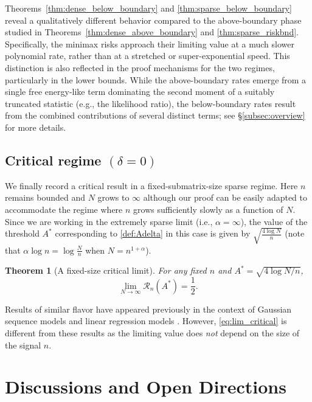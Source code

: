 \documentclass[11pt,reqno,letterpaper]{amsart}
\numberwithin{equation}{section}
\theoremstyle{plain}
\newtheorem{theorem}{Theorem}[section]
\begin{document}
Theorems~\ref{thm:dense_below_boundary} and \ref{thm:sparse_below_boundary} reveal a qualitatively different behavior compared to the above-boundary phase studied in 
Theorems~\ref{thm:dense_above_boundary} and \ref{thm:sparse_riskbnd}. Specifically, the minimax risks approach their limiting value at a much slower polynomial rate, rather than at a stretched or super-exponential speed. This distinction is also reflected in the proof mechanisms for the two regimes, particularly in the lower bounds. While the above-boundary rates emerge from a single free energy-like term dominating the second moment of a suitably truncated statistic (e.g., the likelihood ratio), the below-boundary rates result from the combined contributions of several distinct terms; see \S\ref{subsec:overview} for more details. 


\subsection{Critical regime $(\delta=0)$}\label{subsec:main_on_bnd}
We finally record a critical result in a fixed-submatrix-size sparse regime. Here 
$n$ remains bounded and $N$ grows to $\infty$ although our proof can be easily 
adapted to accommodate the regime where $n$ grows sufficiently slowly as a 
function of $N$. Since we are working in the extremely sparse limit (i.e., $\alpha = \infty$), the value of the threshold $A^\ast$ corresponding to \eqref{def:Adelta} in 
this case is given by $\sqrt{\tfrac{4\log N}{n}}$ (note that $\alpha \log n = \log 
\frac Nn$ when $N = n^{1 + \alpha}$).
\begin{theorem}[A fixed-size critical limit]\label{thm:criticality}
For any fixed $n$ and $A^\ast = \sqrt{4\log N/n}$,
\begin{equation}\label{eq:lim_critical}
\lim_{N\to\infty} \mathcal R_n(A^\ast) = \frac12.
\end{equation}
\end{theorem}
Results of similar flavor have appeared previously in the context of Gaussian 
sequence models \citep[Theorem~8.1]{ingster2012nonparametric} and linear 
regression models \citep[Theorem~2.5]{mukherjee2020minimax}. However, 
\eqref{eq:lim_critical} is different from these results as the limiting value does 
{\em not} depend on the size of the signal $n$.



\section{Discussions and Open Directions}\label{sec:discussions}
\end{document}
